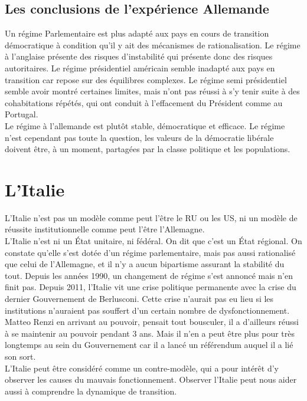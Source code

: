 \documentclass[10pt, a4paper, openany]{book}
\begin{document}
\section{Les conclusions de l'expérience Allemande}

Un régime Parlementaire est plus adapté aux pays en cours de transition démocratique à condition qu'il y ait des mécanismes de rationalisation. Le régime à l'anglaise présente des risques d'instabilité qui présente donc des risques autoritaires. Le régime présidentiel américain semble inadapté aux pays en transition car repose sur des équilibres complexes. Le régime semi présidentiel semble avoir montré certaines limites, mais n'ont pas réussi à s'y tenir suite à des cohabitations répétés, qui ont conduit à l'effacement du Président comme au Portugal. \\
Le régime à l'allemande est plutôt stable, démocratique et efficace. Le régime n'est cependant pas toute la question, les valeurs de la démocratie libérale doivent être, à un moment, partagées par la classe politique et les populations. 


\chapter{L'Italie}

L'Italie n'est pas un modèle comme peut l'être le RU ou les US, ni un modèle de réussite institutionnelle comme peut l'être l'Allemagne. \\
L'Italie n'est ni un État unitaire, ni fédéral. On dit que c'est un État régional. On constate qu'elle s'est dotée d'un régime parlementaire, mais pas aussi rationalisé que celui de l'Allemagne, et il n'y a aucun bipartisme assurant la stabilité du tout. Depuis les années 1990, un changement de régime s'est annoncé mais n'en finit pas. Depuis 2011, l'Italie vit une crise politique permanente avec la crise du dernier Gouvernement de Berlusconi. Cette crise n'aurait pas eu lieu si les institutions n'auraient pas souffert d'un certain nombre de dysfonctionnement. \\
Matteo Renzi en arrivant au pouvoir, pensait tout bousculer, il a d'ailleurs réussi à se maintenir au pouvoir pendant 3 ans. Mais il n'en a peut être plus pour très longtemps au sein du Gouvernement car il a lancé un référendum auquel il a lié son sort. \\
L'Italie peut être considéré comme un contre-modèle, qui a pour intérêt d'y observer les causes du mauvais fonctionnement. Observer l'Italie peut nous aider aussi à comprendre la dynamique de transition. 
\end{document}
